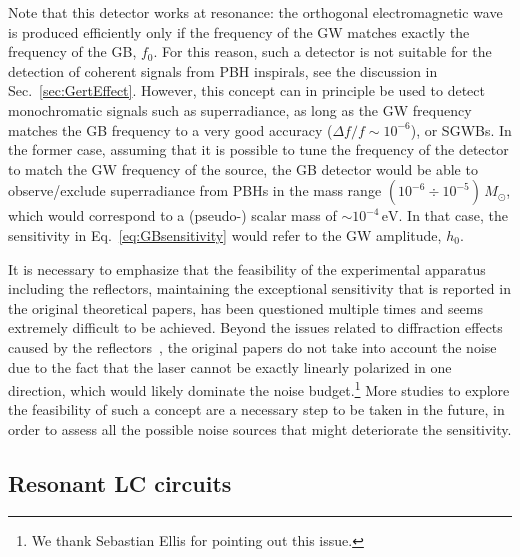 \documentclass[11pt,a4paper]{article}
\begin{document}
Note that this detector works at resonance: the orthogonal electromagnetic wave is produced efficiently only if the frequency of the GW matches exactly the frequency of the GB, $f_0$. For this reason, such a detector is not suitable for the detection of coherent signals from PBH inspirals, see the discussion in Sec.~\ref{sec:GertEffect}. However, this concept can in principle be used to detect monochromatic signals such as superradiance, as long as the GW frequency matches the GB frequency to a very good accuracy ($\Delta f/f \sim 10^{-6}$), or SGWBs. 
In the former case, assuming that it is possible to tune the frequency of the detector to match the GW frequency of the source, the GB detector would be able to observe/exclude superradiance from PBHs in the mass range $(10^{-6} \div 10^{-5}) \, M_\odot$, which would correspond to a (pseudo-) scalar mass of $\sim 10^{-4} \, \text{eV}$. In that case, the sensitivity in Eq.~\eqref{eq:GBsensitivity} would refer to the GW amplitude, $h_0$.

It is necessary to emphasize that the feasibility of the experimental apparatus including the reflectors, maintaining the exceptional sensitivity that is reported in the original theoretical papers, has been questioned multiple times and seems extremely difficult to be achieved. Beyond the issues related to diffraction effects caused by the reflectors~\cite{Woods:2012upj}, the original papers do not take into account the noise due to the fact that the laser cannot be exactly linearly polarized in one direction, which would likely dominate the noise budget.\footnote{We thank Sebastian Ellis for pointing out this issue.} More studies to explore the feasibility of such a concept are a necessary step to be taken in the future, in order to assess all the possible noise sources that might deteriorate the sensitivity.

\subsection{Resonant LC circuits}
\label{sec:Haloscopes}
\end{document}

